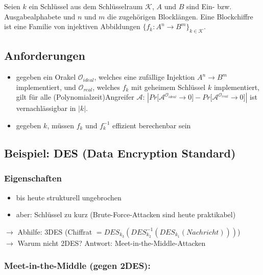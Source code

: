 \documentclass[a4paper,twoside,DIV15,BCOR12mm]{scrbook}
\begin{document}
Seien $k$ ein Schlüssel aus dem Schlüsselraum $\mathcal{K}$, $A$ und $B$ sind Ein- bzw. Ausgabealphabete und $n$ und $m$ die zugehörigen Blocklängen. Eine Blockchiffre ist eine Familie von injektiven Abbildungen $\{ f_k \colon A^n \rightarrow B^m \}_{k \in \mathcal{K}}$. \\


\subsection{Anforderungen}

\begin{itemize}
	\item gegeben ein Orakel $\mathcal{O}_{ideal}$, welches eine zufällige Injektion $A^n \rightarrow B^m$ implementiert, und $\mathcal{O}_{real}$, welches $f_k$ mit geheimem Schlüssel $k$ implementiert, gilt für alle (Polynomialzeit)Angreifer $\mathcal{A}$: $\left| Pr\lbrack \mathcal{A}^{\mathcal{O}_{ideal}} \rightarrow 0 \rbrack - Pr\lbrack \mathcal{A}^{\mathcal{O}_{real}} \rightarrow 0 \rbrack \right|$ ist vernachlässigbar in $\left| k \right|$.
	\item gegeben $k$, müssen $f_k$ und $f_k^{-1}$ effizient berechenbar sein
\end{itemize}

\subsection{Beispiel: DES (Data Encryption Standard)}


\subsubsection{Eigenschaften}

\begin{itemize}
	\item bis heute strukturell ungebrochen
	\item aber: Schlüssel zu kurz (Brute-Force-Attacken sind heute praktikabel)
\end{itemize}

$\rightarrow$ Abhilfe: 3DES (Chiffrat $= {DES}_{k_3}({DES}^{-1}_{k_2}({DES}_{k_1}(Nachricht)))$)\\
$\rightarrow$ Warum nicht 2DES? Antwort: Meet-in-the-Middle-Attacken

\subsubsection{Meet-in-the-Middle (gegen 2DES):}
\end{document}
